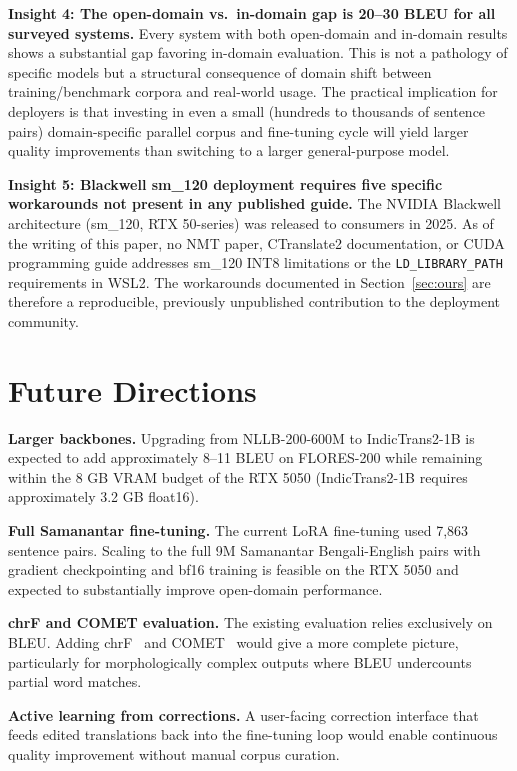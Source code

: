\documentclass[conference]{IEEEtran}
\begin{document}
\textbf{Insight 4: The open-domain vs.\ in-domain gap is 20--30 BLEU
for all surveyed systems.}
Every system with both open-domain and in-domain results shows a
substantial gap favoring in-domain evaluation.
This is not a pathology of specific models but a structural consequence
of domain shift between training/benchmark corpora and real-world usage.
The practical implication for deployers is that investing in even a small
(hundreds to thousands of sentence pairs) domain-specific parallel corpus
and fine-tuning cycle will yield larger quality improvements than switching
to a larger general-purpose model.

\textbf{Insight 5: Blackwell sm\_120 deployment requires five specific
workarounds not present in any published guide.}
The NVIDIA Blackwell architecture (sm\_120, RTX 50-series) was released
to consumers in 2025.
As of the writing of this paper, no NMT paper, CTranslate2 documentation,
or CUDA programming guide addresses sm\_120 INT8 limitations or the
\texttt{LD\_LIBRARY\_PATH} requirements in WSL2.
The workarounds documented in Section~\ref{sec:ours} are therefore a
reproducible, previously unpublished contribution to the deployment community.

\section{Future Directions}
\label{sec:future}

\textbf{Larger backbones.}
Upgrading from NLLB-200-600M to IndicTrans2-1B is expected to add
approximately 8--11 BLEU on FLORES-200 while remaining within the 8 GB
VRAM budget of the RTX 5050 (IndicTrans2-1B requires approximately
3.2 GB float16).

\textbf{Full Samanantar fine-tuning.}
The current LoRA fine-tuning used 7,863 sentence pairs.
Scaling to the full 9M Samanantar Bengali-English pairs with
gradient checkpointing and bf16 training is feasible on the RTX 5050
and expected to substantially improve open-domain performance.

\textbf{chrF and COMET evaluation.}
The existing evaluation relies exclusively on BLEU.
Adding chrF~\cite{popovic2015chrf} and COMET~\cite{rei2020comet} would
give a more complete picture, particularly for morphologically complex
outputs where BLEU undercounts partial word matches.

\textbf{Active learning from corrections.}
A user-facing correction interface that feeds edited translations back
into the fine-tuning loop would enable continuous quality improvement
without manual corpus curation.
\end{document}
